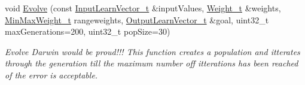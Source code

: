 \begin{DoxyCompactItemize}
void \hyperlink{class_soil_math_1_1_g_a_aca448f36c1f98b4906d0754cf354cccf}{Evolve} (const \hyperlink{_soil_math_types_8h_a45aa81992bf0ddf272907bd4fa0b96cf}{Input\+Learn\+Vector\+\_\+t} \&input\+Values, \hyperlink{_soil_math_types_8h_ac56ad2b88186620fd0de0d213aa715dd}{Weight\+\_\+t} \&weights, \hyperlink{_soil_math_types_8h_aaa919636507bcd52b19efa301aa80b9a}{Min\+Max\+Weight\+\_\+t} rangeweights, \hyperlink{_soil_math_types_8h_a2d8b5a261688166d724b68addd8561e6}{Output\+Learn\+Vector\+\_\+t} \&goal, uint32\+\_\+t max\+Generations=200, uint32\+\_\+t pop\+Size=30)
\begin{DoxyCompactList}\small\item\em Evolve Darwin would be proud!!! This function creates a population and itterates through the generation till the maximum number off itterations has been reached of the error is acceptable. \end{DoxyCompactList}\end{DoxyCompactItemize}
